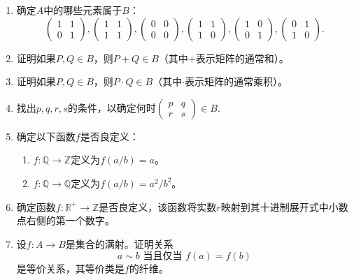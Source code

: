 \begin{enumerate}
\item     
确定$A$中的哪些元素属于$B$：
\[
\begin{pmatrix} 1 & 1 \\ 0 & 1 \end{pmatrix}, \begin{pmatrix} 1 & 1 \\ 1 & 1 \end{pmatrix}, \begin{pmatrix} 0 & 0 \\ 0 & 0 \end{pmatrix}, \begin{pmatrix} 1 & 1 \\ 1 & 0 \end{pmatrix}, \begin{pmatrix} 1 & 0 \\ 0 & 1 \end{pmatrix}, \begin{pmatrix} 0 & 1 \\ 1 & 0 \end{pmatrix}.
\]

\item 证明如果$P, Q \in B$，则$P + Q \in B$（其中$+$表示矩阵的通常和）。
\item 证明如果$P, Q \in B$，则$P \cdot Q \in B$（其中$\cdot$表示矩阵的通常乘积）。
\item 找出$p, q, r, s$的条件，以确定何时$\begin{pmatrix} p & q \\ r & s \end{pmatrix} \in B$.
    
\item 确定以下函数$f$是否良定义：
    \begin{enumerate}
        \item $f: \mathbb{Q} \to \mathbb{Z}$定义为$f(a/b) = a$。
        \item $f: \mathbb{Q} \to \mathbb{Q}$定义为$f(a/b) = a^2/b^2$。
    \end{enumerate}
    
    \item 确定函数$f: \mathbb{R}^+ \to \mathbb{Z}$是否良定义，该函数将实数$r$映射到其十进制展开式中小数点右侧的第一个数字。
    
    \item 设$f: A \to B$是集合的满射。证明关系
    \[
    a \sim b \text{ 当且仅当 } f(a) = f(b)
    \]
    是等价关系，其等价类是$f$的纤维。
\end{enumerate}




